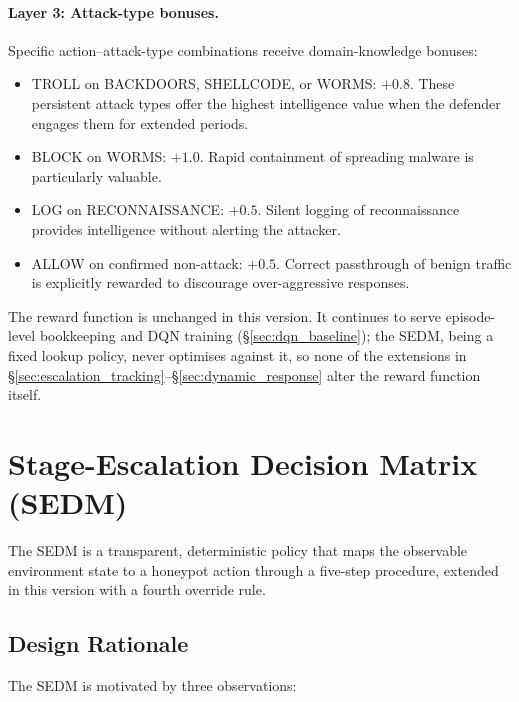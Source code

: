 \paragraph{Layer 3: Attack-type bonuses.}
Specific action--attack-type combinations receive domain-knowledge bonuses:
%
\begin{itemize}
  \item TROLL on BACKDOORS, SHELLCODE, or WORMS: $+0.8$.
        These persistent attack types offer the highest intelligence value
        when the defender engages them for extended periods.
  \item BLOCK on WORMS: $+1.0$.
        Rapid containment of spreading malware is particularly valuable.
  \item LOG on RECONNAISSANCE: $+0.5$.
        Silent logging of reconnaissance provides intelligence without
        alerting the attacker.
  \item ALLOW on confirmed non-attack: $+0.5$.
        Correct passthrough of benign traffic is explicitly rewarded to
        discourage over-aggressive responses.
\end{itemize}

The reward function is unchanged in this version. It continues to serve
episode-level bookkeeping and DQN training (\S\ref{sec:dqn_baseline}); the
SEDM, being a fixed lookup policy, never optimises against it, so none of
the extensions in \S\ref{sec:escalation_tracking}--\S\ref{sec:dynamic_response}
alter the reward function itself.

\section{Stage-Escalation Decision Matrix (SEDM)}
\label{sec:sedm}

The SEDM is a transparent, deterministic policy that maps the observable
environment state to a honeypot action through a five-step procedure,
extended in this version with a fourth override rule.

\subsection{Design Rationale}

The SEDM is motivated by three observations:

